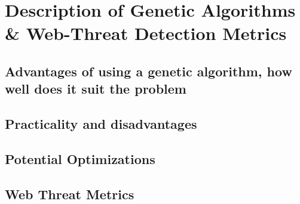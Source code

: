\chapter{Description of Genetic Algorithms \& Web-Threat Detection Metrics}

\section{Advantages of using a genetic algorithm, how well does it suit the problem}

\section{Practicality and disadvantages}

\section{Potential Optimizations}

\section{Web Threat Metrics}